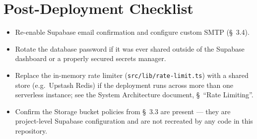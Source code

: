 \documentclass[11pt,a4paper]{article}
\begin{document}
\section{Post-Deployment Checklist}
\begin{itemize}[leftmargin=*]
  \item Re-enable Supabase email confirmation and configure custom SMTP (\S~3.4).
  \item Rotate the database password if it was ever shared outside of the Supabase
        dashboard or a properly secured secrets manager.
  \item Replace the in-memory rate limiter (\texttt{src/lib/rate-limit.ts}) with a
        shared store (e.g.\ Upstash Redis) if the deployment runs across more than one
        serverless instance; see the System Architecture document, \S~``Rate
        Limiting''.
  \item Confirm the Storage bucket policies from \S~3.3 are present --- they are
        project-level Supabase configuration and are not recreated by any code in this
        repository.
\end{itemize}
\end{document}
